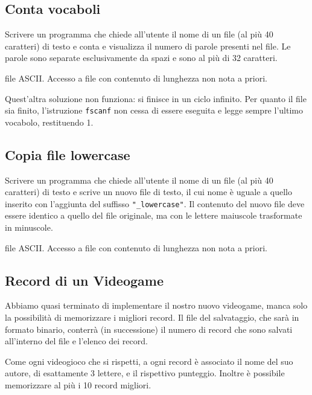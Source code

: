 \subsection{Conta vocaboli}
Scrivere un programma che chiede all'utente il nome di un file (al pi\`u 40 caratteri) di testo e conta e visualizza il numero di parole presenti nel file. Le parole sono separate esclusivamente da spazi e sono al pi\`u di 32 caratteri.

\begin{tags}
file ASCII. Accesso a file con contenuto di lunghezza non nota a priori.
\end{tags}

Quest'altra soluzione non funziona: si finisce in un ciclo infinito. Per quanto il file sia finito, l'istruzione \texttt{fscanf} non cessa di essere eseguita e legge sempre l'ultimo vocabolo, restituendo 1.

\subsection{Copia file lowercase}
Scrivere un programma che chiede all'utente il nome di un file (al pi\`u 40 caratteri) di testo e scrive un nuovo file di testo, il cui nome \`e uguale a quello inserito con l'aggiunta del suffisso \texttt{"\_lowercase"}.
Il contenuto del nuovo file deve essere identico a quello del file originale, ma con le lettere maiuscole trasformate in minuscole.

\begin{tags}
file ASCII. Accesso a file con contenuto di lunghezza non nota a priori.
\end{tags}

\subsection{Record di un Videogame}
Abbiamo quasi terminato di implementare il nostro nuovo videogame, manca solo la possibilit\`a di memorizzare i migliori record.
Il file del salvataggio, che sar\`a in formato binario, conterr\`a (in successione) il numero di record che sono salvati all'interno del file e l'elenco dei record.

Come ogni videogioco che si rispetti, a ogni record \`e associato il nome del suo autore, di esattamente 3 lettere, e il rispettivo punteggio. 
Inoltre \`e possibile memorizzare al pi\`u i 10 record migliori.

